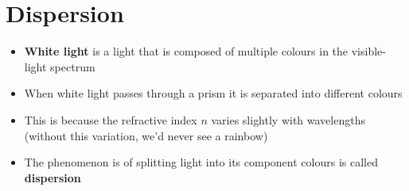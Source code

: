 \section{Dispersion}
%
%
%
%
%
%
% 
%    
\begin{itemize}
\item\textbf{White light} is a light that is composed of multiple colours
  in the visible-light spectrum
\item When white light passes through a prism it is separated into
  different colours
\item This is because the refractive index $n$ varies slightly with
  wavelengths (without this variation, we'd never see a rainbow)
\item The phenomenon is of splitting light into its component colours is
  called \textbf{dispersion}
\end{itemize}
  





